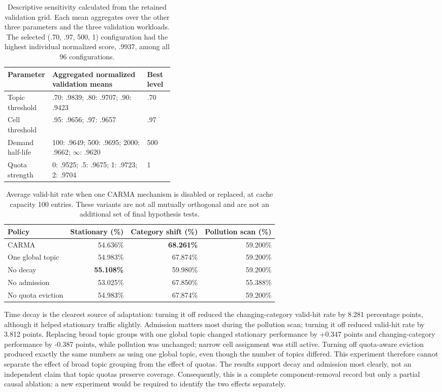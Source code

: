 \documentclass[10pt,letterpaper]{article}
\begin{document}
\begin{table}[ht]
\centering
\begin{tabularx}{\linewidth}{@{}L{0.22\linewidth}Y L{0.16\linewidth}@{}}
\toprule
Parameter & Aggregated normalized validation means & Best level \\
\midrule
Topic threshold & .70: .9839; .80: .9707; .90: .9423 & .70 \\
Cell threshold & .95: .9656; .97: .9657 & .97 \\
Demand half-life & 100: .9649; 500: .9695; 2000: .9662; $\infty$: .9620 & 500 \\
Quota strength & 0: .9525; .5: .9675; 1: .9723; 2: .9704 & 1 \\
\bottomrule
\end{tabularx}
\caption{Descriptive sensitivity calculated from the retained validation
grid. Each mean aggregates over the other three parameters and the three
validation workloads. The selected (.70, .97, 500, 1) configuration had the
highest individual normalized score, .9937, among all 96 configurations.}
\label{tab:parameter-sensitivity}
\end{table}

\begin{table}[ht]
\centering
\begin{tabular}{@{}lrrr@{}}
\toprule
Policy & Stationary (\%) & Category shift (\%) & Pollution scan (\%) \\
\midrule
CARMA & 54.636\% & \textbf{68.261\%} & 59.200\% \\
One global topic & 54.983\% & 67.874\% & 59.200\% \\
No decay & \textbf{55.108\%} & 59.980\% & 59.200\% \\
No admission & 53.025\% & 67.850\% & 55.388\% \\
No quota eviction & 54.983\% & 67.874\% & 59.200\% \\
\bottomrule
\end{tabular}
\caption{Average valid-hit rate when one CARMA mechanism is disabled or
replaced, at cache capacity 100 entries. These variants are not all mutually
orthogonal and are not an additional set of final hypothesis tests.}
\end{table}

Time decay is the clearest source of adaptation: turning it off reduced the
changing-category valid-hit rate by 8.281 percentage points, although it helped
stationary traffic slightly. Admission matters most during the pollution scan;
turning it off reduced valid-hit rate by 3.812 points. Replacing broad topic
groups with one global topic changed stationary performance by +0.347 points
and changing-category performance by -0.387 points, while pollution was
unchanged; narrow cell assignment was still active. Turning off quota-aware
eviction produced exactly the same numbers as using one global topic, even
though the number of topics differed. This experiment therefore cannot
separate the effect of broad topic grouping from the effect of quotas. The
results support decay and admission most clearly, not an independent claim
that topic quotas preserve coverage. Consequently, this is a complete
component-removal record but only a partial causal ablation: a new experiment
would be required to identify the two effects separately.
\end{document}
